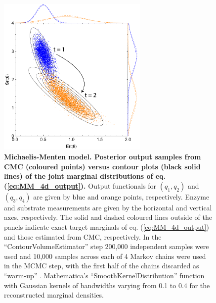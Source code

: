 \begin{figure}[H]
  \centerline{\includegraphics[width=0.65\textwidth]{../figures/mm_4d_outputs.pdf}}
  \caption{\textbf{Michaelis-Menten model. Posterior output samples from CMC (coloured points) versus contour plots (black solid lines) of the joint marginal distributions of eq. (\ref{eq:MM_4d_output}).} Output functionals for $(q_1,q_2)$ and $(q_3,q_4)$ are given by blue and orange points, respectively. Enzyme and substrate measurements are given by the horizontal and vertical axes, respectively. The solid and dashed coloured lines outside of the panels indicate exact target marginals of eq. (\ref{eq:MM_4d_output}) and those estimated from CMC, respectively. In the ``ContourVolumeEstimator'' step 200,000 independent samples were used and 10,000 samples across each of 4 Markov chains were used in the MCMC step, with the first half of the chains discarded as ``warm-up'' \cite{lambert2018Student}. Mathematica's ``SmoothKernelDistribution'' function with Gaussian kernels \cite{mathematica} of bandwidths varying from 0.1 to 0.4 for the reconstructed marginal densities.}
  \label{fig:mm_4d_outputs}
\end{figure}


